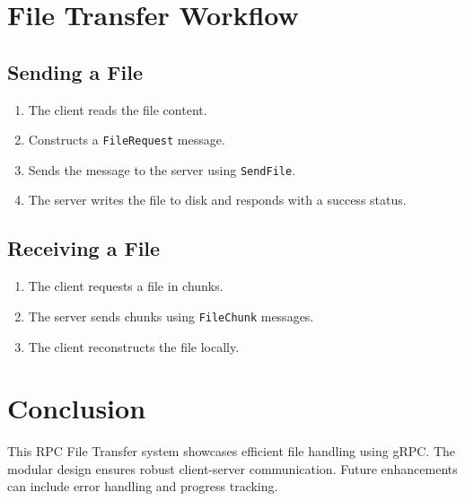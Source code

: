 \documentclass{article}
\begin{document}
\section{File Transfer Workflow}

\subsection{Sending a File}
\begin{enumerate}
    \item The client reads the file content.
    \item Constructs a \texttt{FileRequest} message.
    \item Sends the message to the server using \texttt{SendFile}.
    \item The server writes the file to disk and responds with a success status.
\end{enumerate}

\subsection{Receiving a File}
\begin{enumerate}
    \item The client requests a file in chunks.
    \item The server sends chunks using \texttt{FileChunk} messages.
    \item The client reconstructs the file locally.
\end{enumerate}

\section{Conclusion}
This RPC File Transfer system showcases efficient file handling using gRPC. The modular design ensures robust client-server communication. Future enhancements can include error handling and progress tracking.
\end{document}
